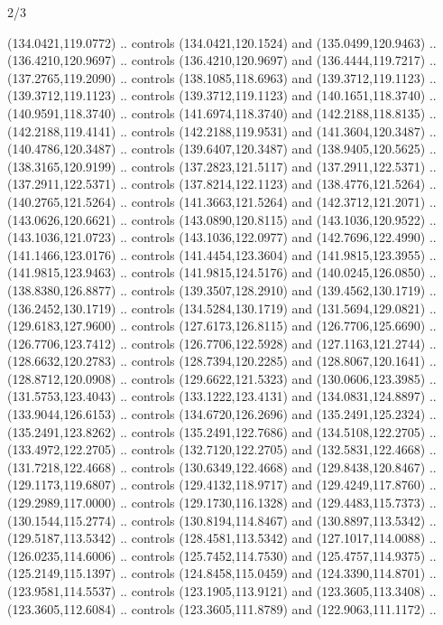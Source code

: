 \begin{flagdescription}{2/3}
\begin{scope}[xshift=0.5\flaglength,yshift=0.5\flagwidth,scale=\flagwidth/180]
\begin{scope}[y=0.8pt, x=0.8pt, yscale=-1,shift={(-168.75,-108.75)}]
  (134.0421,119.0772) .. controls (134.0421,120.1524) and (135.0499,120.9463) ..
  (136.4210,120.9697) .. controls (136.4210,120.9697) and (136.4444,119.7217) ..
  (137.2765,119.2090) .. controls (138.1085,118.6963) and (139.3712,119.1123) ..
  (139.3712,119.1123) .. controls (139.3712,119.1123) and (140.1651,118.3740) ..
  (140.9591,118.3740) .. controls (141.6974,118.3740) and (142.2188,118.8135) ..
  (142.2188,119.4141) .. controls (142.2188,119.9531) and (141.3604,120.3487) ..
  (140.4786,120.3487) .. controls (139.6407,120.3487) and (138.9405,120.5625) ..
  (138.3165,120.9199) .. controls (137.2823,121.5117) and (137.2911,122.5371) ..
  (137.2911,122.5371) .. controls (137.8214,122.1123) and (138.4776,121.5264) ..
  (140.2765,121.5264) .. controls (141.3663,121.5264) and (142.3712,121.2071) ..
  (143.0626,120.6621) .. controls (143.0890,120.8115) and (143.1036,120.9522) ..
  (143.1036,121.0723) .. controls (143.1036,122.0977) and (142.7696,122.4990) ..
  (141.1466,123.0176) .. controls (141.4454,123.3604) and (141.9815,123.3955) ..
  (141.9815,123.9463) .. controls (141.9815,124.5176) and (140.0245,126.0850) ..
  (138.8380,126.8877) .. controls (139.3507,128.2910) and (139.4562,130.1719) ..
  (136.2452,130.1719) .. controls (134.5284,130.1719) and (131.5694,129.0821) ..
  (129.6183,127.9600) .. controls (127.6173,126.8115) and (126.7706,125.6690) ..
  (126.7706,123.7412) .. controls (126.7706,122.5928) and (127.1163,121.2744) ..
  (128.6632,120.2783) .. controls (128.7394,120.2285) and (128.8067,120.1641) ..
  (128.8712,120.0908) .. controls (129.6622,121.5323) and (130.0606,123.3985) ..
  (131.5753,123.4043) .. controls (133.1222,123.4131) and (134.0831,124.8897) ..
  (133.9044,126.6153) .. controls (134.6720,126.2696) and (135.2491,125.2324) ..
  (135.2491,123.8262) .. controls (135.2491,122.7686) and (134.5108,122.2705) ..
  (133.4972,122.2705) .. controls (132.7120,122.2705) and (132.5831,122.4668) ..
  (131.7218,122.4668) .. controls (130.6349,122.4668) and (129.8438,120.8467) ..
  (129.1173,119.6807) .. controls (129.4132,118.9717) and (129.4249,117.8760) ..
  (129.2989,117.0000) .. controls (129.1730,116.1328) and (129.4483,115.7373) ..
  (130.1544,115.2774) .. controls (130.8194,114.8467) and (130.8897,113.5342) ..
  (129.5187,113.5342) .. controls (128.4581,113.5342) and (127.1017,114.0088) ..
  (126.0235,114.6006) .. controls (125.7452,114.7530) and (125.4757,114.9375) ..
  (125.2149,115.1397) .. controls (124.8458,115.0459) and (124.3390,114.8701) ..
  (123.9581,114.5537) .. controls (123.1905,113.9121) and (123.3605,113.3408) ..
  (123.3605,112.6084) .. controls (123.3605,111.8789) and (122.9063,111.1172) ..

\end{scope}
\end{scope}
\end{flagdescription}
